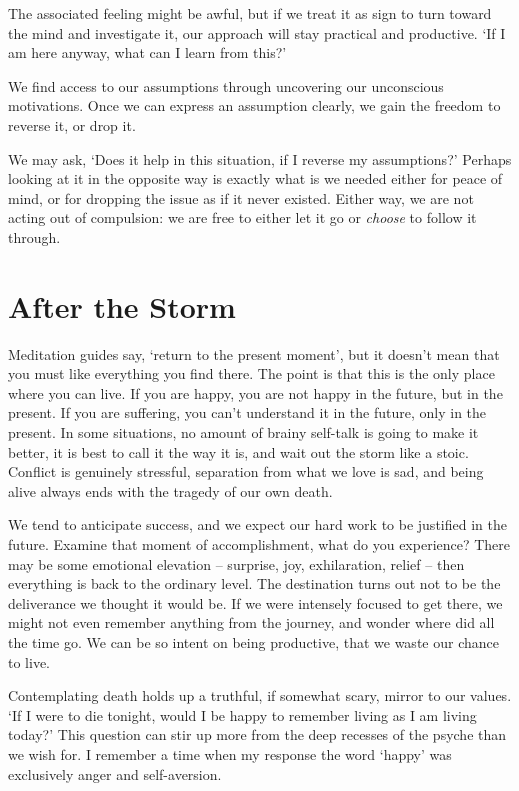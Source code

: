
The associated feeling might be awful, but if we treat it as sign to
turn toward the mind and investigate it, our approach will stay
practical and productive. `If I am here anyway, what can I learn from
this?'

We find access to our assumptions through uncovering our unconscious
motivations. Once we can express an assumption clearly, we gain the
freedom to reverse it, or drop it.

We may ask, `Does it help in this situation, if I reverse my
assumptions?' Perhaps looking at it in the opposite way is exactly what
is we needed either for peace of mind, or for dropping the issue as if
it never existed. Either way, we are not acting out of compulsion: we
are free to either let it go or \emph{choose} to follow it through.

\clearpage

\section{After the Storm}


\noindent Meditation guides say, `return to the present moment', but it
doesn't mean that you must like everything you find there. The point is
that this is the only place where you can live. If you are happy, you
are not happy in the future, but in the present. If you are suffering,
you can't understand it in the future, only in the present. In some
situations, no amount of brainy self-talk is going to make it better, it
is best to call it the way it is, and wait out the storm like a stoic.
Conflict is genuinely stressful, separation from what we love is sad,
and being alive always ends with the tragedy of our own death.

We tend to anticipate success, and we expect our hard work to be
justified in the future. Examine that moment of accomplishment, what do
you experience? There may be some emotional elevation -- surprise, joy,
exhilaration, relief -- then everything is back to the ordinary level.
The destination turns out not to be the deliverance we thought it would
be. If we were intensely focused to get there, we might not even
remember anything from the journey, and wonder where did all the time
go. We can be so intent on being productive, that we waste our chance to
live.

Contemplating death holds up a truthful, if somewhat scary, mirror to
our values. `If I were to die tonight, would I be happy to remember
living as I am living today?' This question can stir up more from the
deep recesses of the psyche than we wish for. I remember a time when my
response the word `happy' was exclusively anger and self-aversion.

